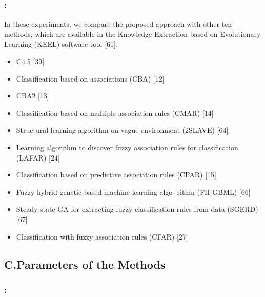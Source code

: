 \documentclass{beamer}
\begin{document}
\begin{CJK*}{UTF8}{bsmi}

\begin{frame}
	\frametitle{\insertsection : \insertsubsection}
	In these experiments, we compare the proposed approach with other ten methods, which are available in the Knowledge Extraction based on Evolutionary Learning (KEEL) software tool [61].
{\footnotesize 	\begin{itemize}
		\item C4.5 [39]
		\item Classification based on associations (CBA) [12]
		\item CBA2 [13]
		\item Classification based on multiple association rules (CMAR) [14]
		\item Structural learning algorithm on vague environment (2SLAVE) [64]
		\item Learning algorithm to discover fuzzy association rules for classification (LAFAR) [24]
		\item Classification based on predictive association rules (CPAR) [15]
		\item Fuzzy hybrid genetic-based machine learning algo- rithm (FH-GBML) [66]
		\item Steady-state GA for extracting fuzzy classification rules
from data (SGERD) [67]
		\item Classification with fuzzy association rules (CFAR) [27]
	\end{itemize}}
\end{frame}


\subsection{C.Parameters of the Methods}

\begin{frame}
	\frametitle{\insertsection : \insertsubsection}
	

\end{frame}
\end{CJK*}
\end{document}
